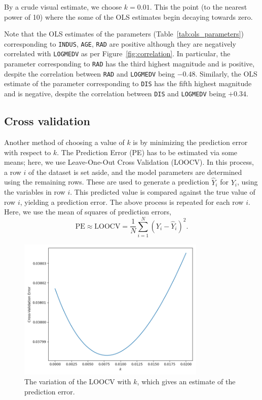 \documentclass[10pt]{article}
\begin{document}
    By a crude visual estimate, we choose $k = 0.01$. This the point (to the nearest
    power of 10) where the some of the OLS estimates begin decaying towards zero.

    Note that the OLS estimates of the parameters (Table~\ref{tab:ols_parameters})
    corresponding to \texttt{INDUS}, \texttt{AGE}, \texttt{RAD} are positive although
    they are negatively correlated with \texttt{LOGMEDV} as per
    Figure~\ref{fig:correlation}. In particular, the parameter corresponding to
    \texttt{RAD} has the third highest magnitude and is positive, despite the
    correlation between \texttt{RAD} and \texttt{LOGMEDV} being $-0.48$. Similarly,
    the OLS estimate of the parameter corresponding to \texttt{DIS} has the fifth
    highest magnitude and is negative, despite the correlation between \texttt{DIS}
    and \texttt{LOGMEDV} being $+0.34$.


    \subsection{Cross validation}

    Another method of choosing a value of $k$ is by minimizing the prediction error
    with respect to $k$. The Prediction Error (PE) has to be estimated via some
    means; here, we use Leave-One-Out Cross Validation (LOOCV). In this process, a
    row $i$ of the dataset is set aside, and the model parameters are determined
    using the remaining rows. These are used to generate a prediction $\hat{Y}_i$ for
    $Y_i$, using the variables in row $i$. This predicted value is compared against
    the true value of row $i$, yielding a prediction error. The above process is
    repeated for each row $i$. Here, we use the mean of squares of prediction errors,
    \[
        \text{PE} \approx \text{LOOCV} = \frac{1}{N}\sum_{i = 1}^N (Y_i - \hat{Y}_i)^2.
    \]

    \begin{figure}[H]
    \begin{center}
        \includegraphics[width=0.8\textwidth]{loocvmse.png}
    \end{center}
    \vspace{-1em}
    \caption{
        The variation of the LOOCV with $k$, which gives an estimate of the
        prediction error.
    }
    \label{fig:loocv}
    \end{figure}
\end{document}
